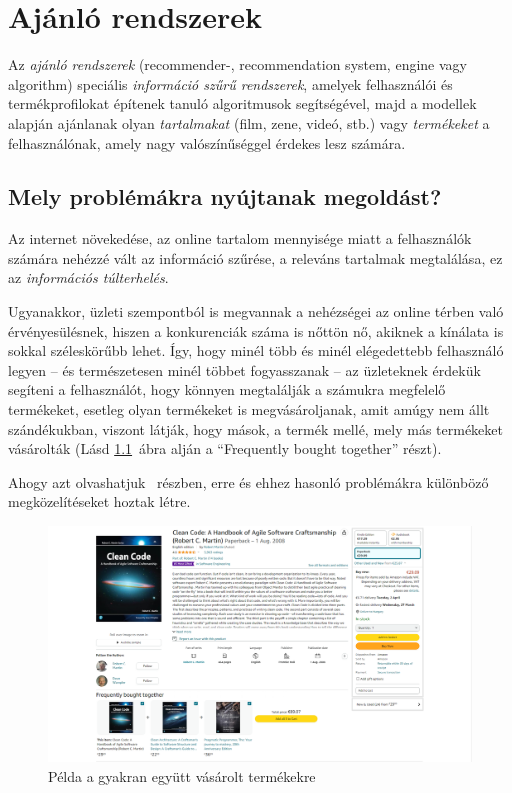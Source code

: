 \documentclass[
]{thesis-ekf}
\theoremstyle{definition}
\theoremstyle{remark}
\begin{document}
\chapter{Ajánló rendszerek}
\label{chap-ajanlo-rendszerek}
Az \emph{ajánló rendszerek} (recommender-, recommendation system, engine vagy algorithm) speciális \emph{információ szűrű rendszerek}, amelyek felhasználói és termékprofilokat építenek tanuló algoritmusok segítségével, majd a modellek alapján ajánlanak olyan \emph{tartalmakat} (film, zene, videó, stb.) vagy \emph{termékeket} a felhasználónak, amely nagy valószínűséggel érdekes lesz számára.\cite{wiki-ajánlórendszer-marketing,wiki-recommender-system,werner-ajanlo-rendszer}

\section {Mely problémákra nyújtanak megoldást?}
Az internet növekedése, az online tartalom mennyisége miatt a felhasználók számára nehézzé vált az információ szűrése, a releváns tartalmak megtalálása, ez az \emph{információs túlterhelés}.\cite{werner-ajanlo-rendszer}

Ugyanakkor, üzleti szempontból is megvannak a nehézségei  az online térben való érvényesülésnek, hiszen a konkurenciák száma is nőttön nő, akiknek a kínálata is sokkal széleskörűbb lehet. Így, hogy minél több és minél elégedettebb felhasználó legyen -- és természetesen minél többet fogyasszanak -- az üzleteknek érdekük segíteni a felhasználót, hogy könnyen megtalálják a számukra megfelelő termékeket, esetleg olyan termékeket is megvásároljanak, amit amúgy nem állt szándékukban, viszont látják, hogy mások, a termék mellé, mely más termékeket vásárolták (Lásd \ref{fig-amazon-frequently-bought-together}~ábra alján a ``Frequently bought together'' részt).

Ahogy azt olvashatjuk ~részben, erre és ehhez hasonló problémákra különböző megközelítéseket hoztak létre.

\begin{figure}[H]
	\centering
	\includegraphics[width=14cm]{images/amazon-frequently-bought-together.png}
	\caption[Példa a gyakran együtt vásárolt termékekre]{Példa a gyakran együtt vásárolt termékekre\footnotemark}
	\label{fig-amazon-frequently-bought-together}
\end{figure}
\end{document}
